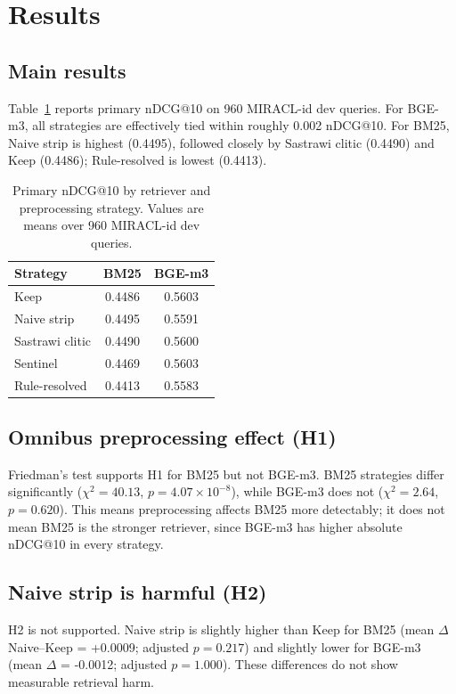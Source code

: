 \section{Results}
\label{sec:results}

\subsection{Main results}

Table~\ref{tab:main-ndcg10} reports primary nDCG@10 on 960 MIRACL-id dev queries. For BGE-m3, all strategies are effectively tied within roughly 0.002 nDCG@10. For BM25, Naive strip is highest (0.4495), followed closely by Sastrawi clitic (0.4490) and Keep (0.4486); Rule-resolved is lowest (0.4413).

\begin{table}[t]
\centering
\caption{Primary nDCG@10 by retriever and preprocessing strategy. Values are means over 960 MIRACL-id dev queries.}
\label{tab:main-ndcg10}
\begin{tabular}{lcc}
\toprule
Strategy & BM25 & BGE-m3 \\
\midrule
Keep & 0.4486 & 0.5603 \\
Naive strip & 0.4495 & 0.5591 \\
Sastrawi clitic & 0.4490 & 0.5600 \\
Sentinel & 0.4469 & 0.5603 \\
Rule-resolved & 0.4413 & 0.5583 \\
\bottomrule
\end{tabular}
\end{table}

\subsection{Omnibus preprocessing effect (H1)}

Friedman's test supports H1 for BM25 but not BGE-m3. BM25 strategies differ significantly ($\chi^2 = 40.13$, $p = 4.07\times10^{-8}$), while BGE-m3 does not ($\chi^2 = 2.64$, $p = 0.620$). This means preprocessing affects BM25 more detectably; it does not mean BM25 is the stronger retriever, since BGE-m3 has higher absolute nDCG@10 in every strategy.

\subsection{Naive strip is harmful (H2)}

H2 is not supported. Naive strip is slightly higher than Keep for BM25 (mean $\Delta$ Naive--Keep = +0.0009; adjusted $p = 0.217$) and slightly lower for BGE-m3 (mean $\Delta$ = -0.0012; adjusted $p = 1.000$). These differences do not show measurable retrieval harm.

